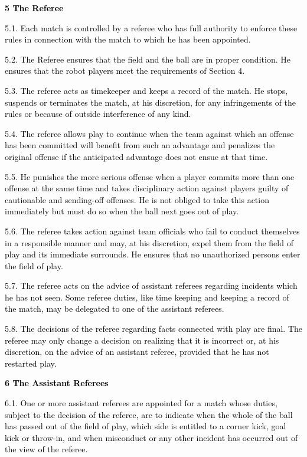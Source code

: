 \documentclass[a4paper]{article}
\begin{document}
\bigskip

\textbf{\textcolor{black}{5 The Referee}}

\textcolor{black}{5.1. Each match is controlled by a referee who has full authority to enforce these rules in connection
with the match to which he has been appointed.}

\textcolor{black}{5.2. The Referee ensures that the field and the ball are in proper condition. He ensures that the
robot players meet the requirements of Section 4.}

\textcolor{black}{5.3. The referee acts as timekeeper and keeps a record of the match. He stops, suspends or terminates
the match, at his discretion, for any infringements of the rules or because of outside interference of any kind.}

\textcolor{black}{5.4. The referee allows play to continue when the team against which an offense has been committed
will benefit from such an advantage and penalizes the original offense if the anticipated advantage does not ensue at
that time.}

\textcolor{black}{5.5. He punishes the more serious offense when a player commits more than one offense at the same time
and takes disciplinary action against players guilty of cautionable and sending-off offenses. He is not obliged to take
this action immediately but must do so when the ball next goes out of play.}

\textcolor{black}{5.6. The referee takes action against team officials who fail to conduct themselves in a responsible
manner and may, at his discretion, expel them from the field of play and its immediate surrounds. He ensures that no
unauthorized persons enter the field of play.}

\textcolor{black}{5.7. The referee acts on the advice of assistant referees regarding incidents which he has not seen.
Some referee duties, like time keeping and keeping a record of the match, may be delegated to one of the assistant
referees.}

\textcolor{black}{5.8. The decisions of the referee regarding facts connected with play are final. The referee may only
change a decision on realizing that it is incorrect or, at his discretion, on the advice of an assistant referee,
provided that he has not restarted play.}


\bigskip


\bigskip

\textbf{\textcolor{black}{6 The Assistant Referees}}

\textcolor{black}{6.1. One or more assistant referees are appointed for a match whose duties, subject to the decision of
the referee, are to indicate when the whole of the ball has passed out of the field of play, which side is entitled to
a corner kick, goal kick or throw-in, and when misconduct or any other incident has occurred out of the view of the
referee.}
\end{document}
